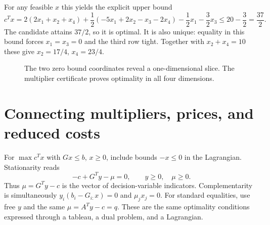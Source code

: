 \documentclass[11pt,a4paper]{article}
\begin{document}
For any feasible $x$ this yields the explicit upper bound
\[
  c^Tx
  =2(2x_1+x_2+x_4)
  +\frac12(-5x_1+2x_2-x_3-2x_4)
  -\frac12x_1-\frac32x_3
  \leq20-\frac32=\frac{37}{2}.
\]
The candidate attains $37/2$, so it is optimal.
It is also unique: equality in this bound forces $x_1=x_3=0$ and the
third row tight. Together with $x_2+x_4=10$ these give
$x_2=17/4$, $x_4=23/4$.

\begin{figure}[H]\centering
  \caption{The two zero bound coordinates reveal a one-dimensional slice.
    The multiplier certificate proves optimality in all four dimensions.}
\end{figure}

\section{Connecting multipliers, prices, and reduced costs}\label{sec:connections}
For $\max c^Tx$ with $Gx\leq b$, $x\geq0$, include bounds $-x\leq0$ in
the Lagrangian. Stationarity reads
\[
  -c+G^Ty-\mu=0,\qquad y\geq0,\quad\mu\geq0.
\]
Thus $\mu=G^Ty-c$ is the vector of decision-variable indicators.
Complementarity is simultaneously $y_i(b_i-G_{i:}x)=0$ and $\mu_jx_j=0$.
For standard equalities, use free $y$ and the same
$\mu=A^Ty-c=q$. These are the same optimality conditions expressed through
a tableau, a dual problem, and a Lagrangian.
\end{document}
